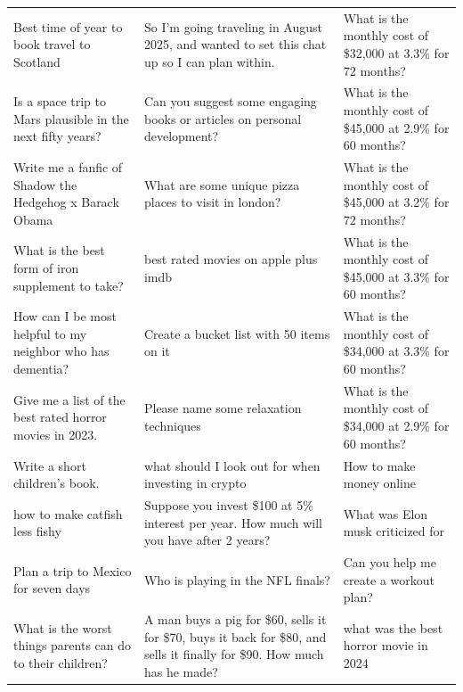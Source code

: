 \begin{table}[ht]
\begin{tabular}{p{4.3cm}p{4.3cm}p{4.3cm}}
Best time of year to book travel to Scotland & So I'm going traveling in August 2025, and wanted to set this chat up so I can plan within. & What is the monthly cost of \$32,000 at 3.3\% for 72 months? \\[4pt]
Is a space trip to Mars plausible in the next fifty years? & Can you suggest some engaging books or articles on personal development? & What is the monthly cost of \$45,000 at 2.9\% for 60 months? \\[4pt]
Write me a fanfic of Shadow the Hedgehog x Barack Obama & What are some unique pizza places to visit in london? & What is the monthly cost of \$45,000 at 3.2\% for 72 months? \\[4pt]
What is the best form of iron supplement to take? & best rated movies on apple plus imdb & What is the monthly cost of \$45,000 at 3.3\% for 60 months? \\[4pt]
How can I be most helpful to my neighbor who has dementia? & Create a bucket list with 50 items on it & What is the monthly cost of \$34,000 at 3.3\% for 60 months? \\[4pt]
Give me a list of the best rated horror movies in 2023. & Please name some relaxation techniques & What is the monthly cost of \$34,000 at 2.9\% for 60 months? \\[4pt]
Write a short children’s book. & what should I look out for when investing in crypto & How to make money online \\[4pt]
how to make catfish less fishy & Suppose you invest \$100 at 5\% interest per year. How much will you have after 2 years? & What was Elon musk criticized for \\[4pt]
Plan a trip to Mexico for seven days & Who is playing in the NFL finals? & Can you help me create a workout plan? \\[4pt]
What is the worst things parents can do to their children? & A man buys a pig for \$60, sells it for \$70, buys it back for \$80, and sells it finally for \$90. How much has he made? & what was the best horror movie in 2024 \\[4pt]

\end{tabular}
\end{table}
